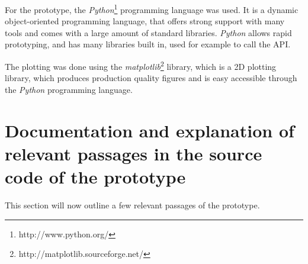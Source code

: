 For the prototype, the \textit{Python}\footnote{http://www.python.org/} programming
language was used. It is a dynamic object-oriented programming language, that
offers strong support with many tools and comes with a large amount of standard
libraries. \textit{Python} allows rapid prototyping, and has many libraries built
in, used for example to call the \Twitter{} API.

The plotting was done using the
\textit{matplotlib}\footnote{http://matplotlib.sourceforge.net/} library, which
is a 2D plotting library, which produces production quality figures and is easy
accessible through the \textit{Python} programming language.

\section{Documentation and explanation of relevant passages in the source code of the prototype}

This section will now outline a few relevant passages of the prototype.
